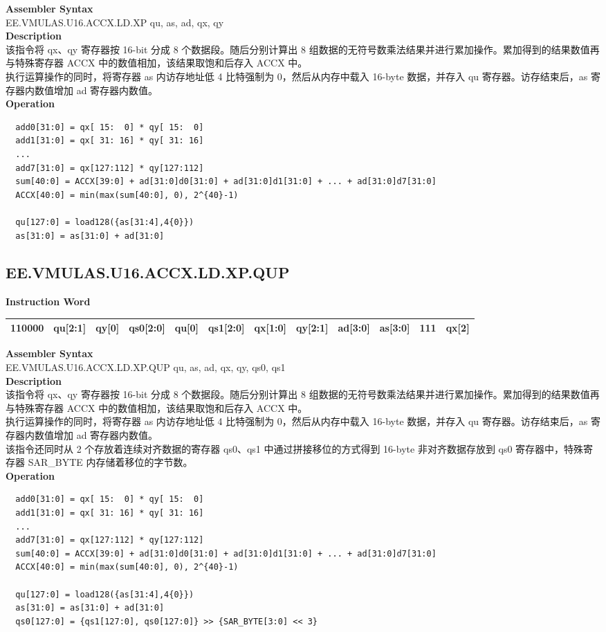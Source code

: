 \textbf{Assembler Syntax} \\
EE.VMULAS.U16.ACCX.LD.XP qu, as, ad, qx, qy \\
\textbf{Description} \\
该指令将 qx、qy 寄存器按 16-bit 分成 8 个数据段。随后分别计算出 8 组数据的无符号数乘法结果并进行累加操作。累加得到的结果数值再与特殊寄存器 ACCX 中的数值相加，该结果取饱和后存入 ACCX 中。\\
执行运算操作的同时，将寄存器 as 内访存地址低 4 比特强制为 0，然后从内存中载入 16-byte 数据，并存入 qu 寄存器。访存结束后，as 寄存器内数值增加 ad 寄存器内数值。\\
\textbf{Operation}
\begin{lstlisting}
  add0[31:0] = qx[ 15:  0] * qy[ 15:  0]
  add1[31:0] = qx[ 31: 16] * qy[ 31: 16]
  ...
  add7[31:0] = qx[127:112] * qy[127:112]
  sum[40:0] = ACCX[39:0] + ad[31:0]d0[31:0] + ad[31:0]d1[31:0] + ... + ad[31:0]d7[31:0]
  ACCX[40:0] = min(max(sum[40:0], 0), 2^{40}-1)

  qu[127:0] = load128({as[31:4],4{0}})
  as[31:0] = as[31:0] + ad[31:0]
\end{lstlisting}

\clearpage
\subsection{EE.VMULAS.U16.ACCX.LD.XP.QUP}\label{instruction:EEVMULASU16ACCXLDXPQUP}
\setlength\tabcolsep{6pt}
\textbf{Instruction Word} \\
\begin{tabular}{|c|c|c|c|c|c|c|c|c|c|c|c|}
	\hline
	110000 & qu[2:1] & qy[0] & qs0[2:0] & qu[0] & qs1[2:0] & qx[1:0] & qy[2:1] & ad[3:0] & as[3:0] & 111 & qx[2] \\
	\hline
\end{tabular}

\textbf{Assembler Syntax} \\
EE.VMULAS.U16.ACCX.LD.XP.QUP qu, as, ad, qx, qy, qs0, qs1 \\
\textbf{Description} \\
该指令将 qx、qy 寄存器按 16-bit 分成 8 个数据段。随后分别计算出 8 组数据的无符号数乘法结果并进行累加操作。累加得到的结果数值再与特殊寄存器 ACCX 中的数值相加，该结果取饱和后存入 ACCX 中。\\
执行运算操作的同时，将寄存器 as 内访存地址低 4 比特强制为 0，然后从内存中载入 16-byte 数据，并存入 qu 寄存器。访存结束后，as 寄存器内数值增加 ad 寄存器内数值。\\
该指令还同时从 2 个存放着连续对齐数据的寄存器 qs0、qs1 中通过拼接移位的方式得到 16-byte 非对齐数据存放到 qs0 寄存器中，特殊寄存器 SAR\_BYTE 内存储着移位的字节数。\\
\textbf{Operation}
\begin{lstlisting}
  add0[31:0] = qx[ 15:  0] * qy[ 15:  0]
  add1[31:0] = qx[ 31: 16] * qy[ 31: 16]
  ...
  add7[31:0] = qx[127:112] * qy[127:112]
  sum[40:0] = ACCX[39:0] + ad[31:0]d0[31:0] + ad[31:0]d1[31:0] + ... + ad[31:0]d7[31:0]
  ACCX[40:0] = min(max(sum[40:0], 0), 2^{40}-1)

  qu[127:0] = load128({as[31:4],4{0}})
  as[31:0] = as[31:0] + ad[31:0]
  qs0[127:0] = {qs1[127:0], qs0[127:0]} >> {SAR_BYTE[3:0] << 3}
\end{lstlisting}

